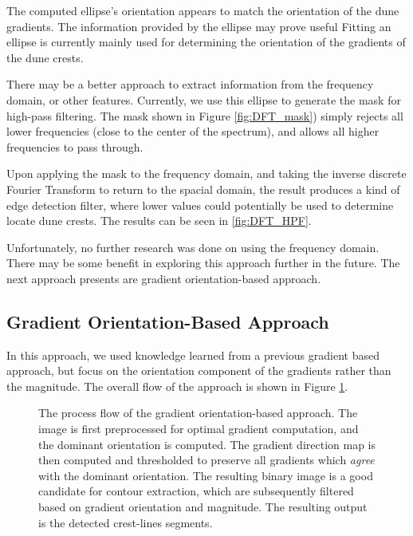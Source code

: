 The computed ellipse's orientation appears to match the orientation of the dune gradients. The information provided by the ellipse may prove useful Fitting an ellipse is currently mainly used for determining the orientation of the gradients of the dune crests. 

There may be a better approach to extract information from the frequency domain, or other features. Currently, we use this ellipse to generate the mask for high-pass filtering. The mask shown in Figure \ref{fig:DFT_mask}) simply rejects all lower frequencies (close to the center of the spectrum), and allows all higher frequencies to pass through. 

Upon applying the mask to the frequency domain, and taking the inverse discrete Fourier Transform to return to the spacial domain, the result produces a kind of edge detection filter, where lower values could potentially be used to determine locate dune crests. The results can be seen in \ref{fig:DFT_HPF}.

Unfortunately, no further research was done on using the frequency domain. There may be some benefit in exploring this approach further in the future. The next approach presents are gradient orientation-based approach.




\subsection{Gradient Orientation-Based Approach} \label{subsec:gradient_orientation_based}
In this approach, we used knowledge learned from a previous gradient based approach, but focus on the orientation component of the gradients rather than the magnitude. The overall flow of the approach is shown in Figure \ref{fig:flow_gradient_orientation}. 

\begin{figure}[H]
	\centering
	\caption{The process flow of the gradient orientation-based approach. The image is first preprocessed for optimal gradient computation, and the dominant orientation is computed. The gradient direction map is then computed and thresholded to preserve all gradients which \emph{agree} with the dominant orientation. The resulting binary image is a good candidate for contour extraction, which are subsequently filtered based on gradient orientation and magnitude. The resulting output is the detected crest-lines segments. }
	\label{fig:flow_gradient_orientation}
\end{figure}


